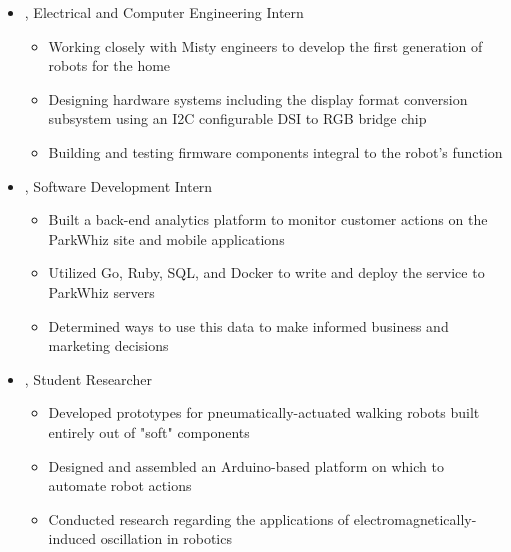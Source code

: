 \documentclass[10pt,letterpaper]{article}
\begin{document}
\begin{itemize}[label={}]
 \item \small{, Electrical and Computer Engineering Intern  \hfill {}}
 \vspace{-1.58mm}
 \begin{itemize}[label={}]
    \item \small{Working closely with Misty engineers to develop the first generation of robots for the home}
 	\item \small{Designing hardware systems including the display format conversion subsystem using an I2C configurable DSI to RGB bridge chip}
 	\item \small{Building and testing firmware components integral to the robot's function}
 \end{itemize}
 \item \small{, Software Development Intern  \hfill {}}
 \vspace{-1.58mm}
 \begin{itemize}[label={}]
 	\item \small{Built a back-end analytics platform to monitor customer actions on the ParkWhiz site and mobile applications}
 	\item \small{Utilized Go, Ruby, SQL, and Docker to write and deploy the service to ParkWhiz servers}
 	\item \small{Determined ways to use this data to make informed business and marketing decisions}
 \end{itemize}
 \item \small{, Student Researcher  \hfill {}}
 \vspace{-1.58mm}
 \begin{itemize}[label={}]
 	\item \small{Developed prototypes for pneumatically-actuated walking robots built entirely out of "soft" components}
 	\item \small{Designed and assembled an Arduino-based platform on which to automate robot actions}
 	\item \small{Conducted research regarding the applications of electromagnetically-induced oscillation in robotics}
 \end{itemize}
\end{itemize}
\end{document}
